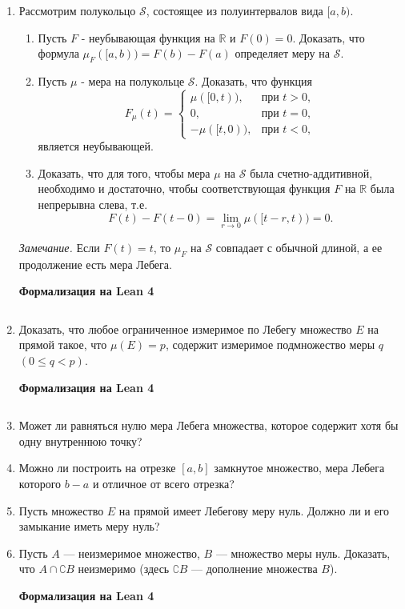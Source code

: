 \documentclass[12pt,a4paper]{article}
\begin{document}
\begin{enumerate}
\newpage
\item Рассмотрим полукольцо $\mathcal{S}$, состоящее из полуинтервалов вида $[a, b)$.
\begin{enumerate}[label=\alph*)]
\item Пусть $F$ - неубывающая функция на $\mathbb{R}$ и $F(0)=0$. Доказать, что формула $\mu_{F}([a,b)) = F(b) - F(a)$ определяет меру на $\mathcal{S}$.
\item Пусть $\mu$ - мера на полукольце $\mathcal{S}$. Доказать, что функция
$$F_{\mu}(t) =
\begin{cases} \mu([0,t)), & \text{при } t > 0, \\ 0, & \text{при } t = 0, \\ -\mu([t,0)), & \text{при } t < 0,
\end{cases}$$
является неубывающей.
\item Доказать, что для того, чтобы мера $\mu$ на $\mathcal{S}$ была счетно-аддитивной, необходимо и достаточно, чтобы соответствующая функция $F$ на $\mathbb{R}$ была непрерывна слева, т.е.
$$F(t) - F(t-0) = \lim_{r \rightarrow 0} \mu([t-r, t)) = 0.$$
\end{enumerate}
\textit{Замечание.} Если $F(t) = t$, то $\mu_{F}$ на $\mathcal{S}$ совпадает с обычной длиной, а ее продолжение есть мера Лебега.


\begin{center}\small\textbf{Формализация на Lean 4}\end{center}
\inputminted{lean}{FunAn/Section02_Measure/Task13.lean}

\newpage
\item Доказать, что любое ограниченное измеримое по Лебегу множество $E$ на прямой такое, что $\mu(E) = p$, содержит измеримое подмножество меры $q$ $(0 \le q < p)$.


\begin{center}\small\textbf{Формализация на Lean 4}\end{center}
\inputminted{lean}{FunAn/Section02_Measure/Task14.lean}

\newpage

\item Может ли равняться нулю мера Лебега множества, которое содержит хотя бы одну внутреннюю точку?

\item Можно ли построить на отрезке $[a, b]$ замкнутое множество, мера Лебега которого $b-a$ и отличное от всего отрезка?

\item Пусть множество $E$ на прямой имеет Лебегову меру нуль. Должно ли и его замыкание иметь меру нуль?

\newpage
\item Пусть $A$ — неизмеримое множество, $B$ — множество меры нуль. Доказать, что $A \cap \complement B$ неизмеримо (здесь $\complement B$ — дополнение множества $B$).

\begin{center}\small\textbf{Формализация на Lean 4}\end{center}
\inputminted{lean}{FunAn/Section02_Measure/Task18.lean}

\end{enumerate}
\end{document}
